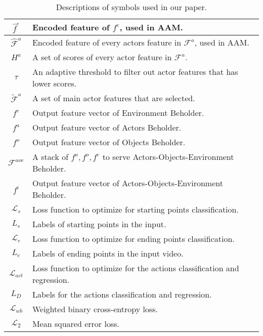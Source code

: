 \documentclass[sn-mathphys]{sn-jnl}
\theoremstyle{thmstyleone}\newtheorem{theorem}{Theorem}\newtheorem{proposition}[theorem]{Proposition}
\theoremstyle{thmstyletwo}\newtheorem{example}{Example}\newtheorem{remark}{Remark}
\theoremstyle{thmstylethree}\newtheorem{definition}{Definition}
\begin{document}
\begin{table}[!ht]
\begin{tabular}{c|l}
        $\hat{f}^e$ & Encoded feature of $f^e$, used in AAM.\\ \hline
        $\hat{\mathcal{F}}^a$ & Encoded feature of every actors feature in $\mathcal{F}^a$, used in AAM.\\ \hline
        $H^a$ & A set of scores of every actor feature in $\mathcal{F}^a$.\\ \hline
        $\tau$ & An adaptive threshold to filter out actor features that has lower scores.\\ \hline
        $\tilde{\mathcal{F}}^a$ & A set of main actor features that are selected.\\ \hline
        $f^e$ & Output feature vector of Environment Beholder.\\ \hline
        $f^a$ & Output feature vector of Actors Beholder.\\ \hline
        $f^o$ & Output feature vector of Objects Beholder.\\ \hline
        $\mathcal{F}^{aoe}$ & A stack of $f^a,f^o,f^e$ to serve Actors-Objects-Environment Beholder.\\ \hline
        $f^i$ & Output feature vector of Actors-Objects-Environment Beholder.\\ \hline
        $\mathcal{L}_s$ & Loss function to optimize for starting points classification.\\ \hline
        $L_s$ & Labels of starting points in the input.\\ \hline
        $\mathcal{L}_e$ & Loss function to optimize for ending points classification.\\ \hline
        $L_e$ & Labels of ending points in the input video.\\ \hline
        $\mathcal{L}_{act}$ & Loss function to optimize for the actions classification and regression.\\ \hline
        $L_{D}$ & Labels for the actions classification and regression.\\ \hline
        $\mathcal{L}_{wb}$ & Weighted binary cross-entropy loss.\\ \hline
        $\mathcal{L}_{2}$ & Mean squared error loss.\\ \hline
    \end{tabular}
\caption{Descriptions of symbols used in our paper.}
    \label{tab:notations}
\end{table}
\end{document}
